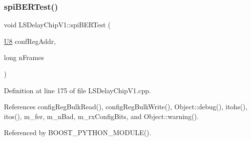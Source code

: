 \subsubsection{\texorpdfstring{spi\+B\+E\+R\+Test()}{spiBERTest()}}
{\footnotesize\ttfamily void L\+S\+Delay\+Chip\+V1\+::spi\+B\+E\+R\+Test (\begin{DoxyParamCaption}\item[{\hyperlink{ICECALv3_8h_a3cb25ca6f51f003950f9625ff05536fc}{U8}}]{conf\+Reg\+Addr,  }\item[{long}]{n\+Frames }\end{DoxyParamCaption})}



Definition at line 175 of file L\+S\+Delay\+Chip\+V1.\+cpp.



References config\+Reg\+Bulk\+Read(), config\+Reg\+Bulk\+Write(), Object\+::debug(), itohs(), itos(), m\+\_\+fer, m\+\_\+n\+Bad, m\+\_\+rx\+Config\+Bits, and Object\+::warning().



Referenced by B\+O\+O\+S\+T\+\_\+\+P\+Y\+T\+H\+O\+N\+\_\+\+M\+O\+D\+U\+L\+E().


